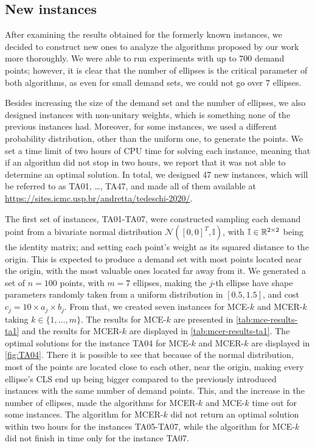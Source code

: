 \subsection{New instances}

After examining the results obtained for the formerly known instances, we decided to construct new ones to analyze the algorithms proposed by our work more thoroughly. {\color{Red}We were able to run experiments with up to $700$ demand points; however, it is clear that the number of ellipses is the critical parameter of both algorithms, as even for small demand sets, we could not go over $7$ ellipses.}

Besides increasing the size of the demand set and the number of ellipses, we also designed instances with non-unitary weights, which is something none of the previous instances had. 
Moreover, for some instances, we used a different probability distribution, other than the uniform one, to generate the points.
We set a time limit of two hours of CPU time for solving each instance, meaning that if an algorithm did not stop in two hours, we report that it was not able to determine an optimal solution. 
In total, we designed 47 new instances, which will be referred to as TA01, \dots, TA47, and made all of them available at \url{https://sites.icmc.usp.br/andretta/tedeschi-2020/}.

The first set of instances, TA01-TA07, were constructed sampling each demand point from a bivariate normal distribution $\mathcal{N}([0, 0]^T, \mathbb{I})$, with $\mathbb{I} \in \mathbb{R}^{2\times 2}$ being the identity matrix; and setting each point's weight as its squared distance to the origin. This is expected to produce a demand set with most points located near the origin, with the most valuable ones located far away from it.
We generated a set of $n=100$ points, with $m=7$ ellipses, making the $j$-th ellipse have shape parameters randomly taken from a uniform distribution in $[0.5, 1.5]$, and cost $c_j=10\times a_j \times b_j$. From that, we created seven instances for MCE-$k$ and MCER-$k$ taking $k \in \{1, \dots, m\}$. The results for MCE-$k$ are presented in \autoref{tab:mce-results-ta1} and the results for MCER-$k$ are displayed in \autoref{tab:mcer-results-ta1}.
The optimal solutions for the instance TA04 for MCE-$k$ and MCER-$k$ are displayed in \autoref{fig:TA04}. There it is possible to see that because of the normal distribution, most of the points are located close to each other, near the origin, making every ellipse's CLS end up being bigger compared to the previously introduced instances with the same number of demand points. 
This, and the increase in the number of ellipses, made the algorithms for MCER-$k$ and MCE-$k$ time out for some instances. The algorithm for MCER-$k$ did not return an optimal solution within two hours for the instances TA05-TA07, while the algorithm for MCE-$k$ did not finish in time only for the instance TA07. 

